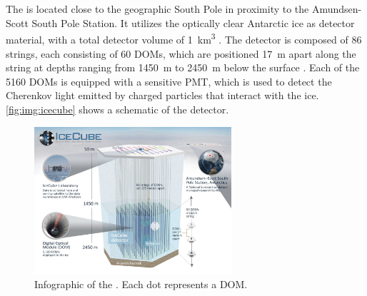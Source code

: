 \section{\icecube{}}
The \icecubeneutrinoobservatory{} is located close to the geographic South Pole
  in proximity to the Amundsen-Scott South Pole Station.
It utilizes the optically clear Antarctic ice as detector material,
  with a total detector volume of \SI{1}{\cubic\kilo\meter} \cite{icecube_aartsen}.
The detector is composed of \num{86} strings,
  each consisting of \num{60} \acp{DOM},
    which are positioned
      \SI{17}{\meter} apart along the string
      at depths ranging from \SI{1450}{\meter} to \SI{2450}{\meter} below the surface \cite{icecube_aartsen}.
Each of the \num{5160} \acp{DOM} is equipped with a sensitive \ac{PMT},
  which is used to detect the Cherenkov light emitted by charged particles
  that interact with the ice.
%
\autoref{fig:img:icecube} shows a schematic of the \icecube{} detector.



\begin{figure}
  \centering
  \includegraphics[width=0.65\textwidth]{content/img/icecube_detector_schematic.jpg}
  \caption{
    Infographic
    of the \icecubeneutrinoobservatory{} \cite{icecube_homepage}.
    Each dot represents a \ac{DOM}.
  }
  \label{fig:img:icecube}
\end{figure}



